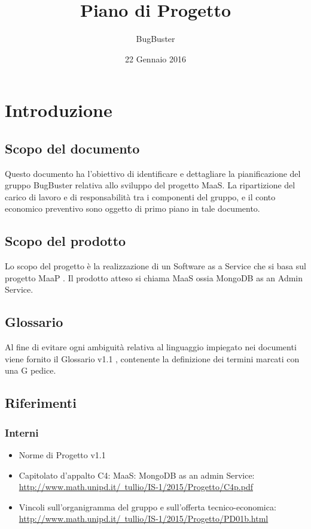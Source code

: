 \documentclass[11pt,a4paper]{article}
\title{\textbf{Piano di Progetto}}
\author{BugBuster}
\date{22 Gennaio 2016}
\begin{document}
\maketitle

\tableofcontents





\section{Introduzione}
\subsection{Scopo del documento}
Questo documento ha l’obiettivo di identificare e dettagliare la pianificazione del gruppo BugBuster
relativa allo sviluppo del progetto MaaS. La ripartizione del carico di lavoro e di responsabilità tra i
componenti del gruppo, e il conto economico preventivo sono oggetto di primo piano in tale documento.

\subsection{Scopo del prodotto}
Lo scopo del progetto è la realizzazione di un Software as a Service che si basa sul progetto MaaP . Il prodotto atteso si chiama MaaS ossia MongoDB as an Admin Service.

\subsection{Glossario}
Al fine di evitare ogni ambiguità relativa al linguaggio impiegato nei documenti viene fornito il Glossario
v1.1 , contenente la definizione dei termini marcati con una G pedice.

\subsection{Riferimenti}
\subsubsection{Interni}
\begin{itemize}
\item Norme di Progetto v1.1
\item Capitolato d'appalto C4: MaaS: MongoDB as an admin Service: \\ \hyperlink{http://www.math.unipd.it/~tullio/IS-1/2015/Progetto/C4p.pdf}{http://www.math.unipd.it/~tullio/IS-1/2015/Progetto/C4p.pdf} 
\item Vincoli sull’organigramma del gruppo e sull’offerta tecnico-economica: \\
\hyperlink{http://www.math.unipd.it/~tullio/IS-1/2015/Progetto/PD01b.html}{http://www.math.unipd.it/~tullio/IS-1/2015/Progetto/PD01b.html}
\end{itemize}
\end{document}
